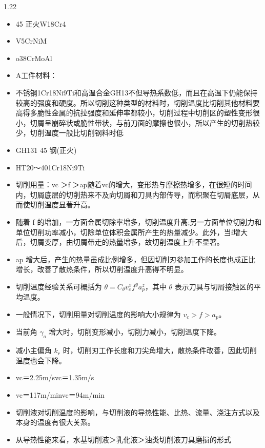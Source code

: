 \documentclass[12pt,a4paper]{article}
\begin{document}
\begin{spacing}{1.22}
\begin{itemize}[leftmargin=2.2em,label=--]
  \item 45 正火W18Cr4
  \item V5CrNiM
  \item o38CrMoAl
  \item A工件材料：
  \item 不锈钢1Cr18Ni9Ti和高温合金GH13不但导热系数低，而且在高温下仍能保持较高的强度和硬度。所以切削这种类型的材料时，切削温度比切削其他材料要高得多脆性金属的抗拉强度和延伸率都较小，切削过程中切削区的塑性变形很小，切屑呈崩碎状或脆性带状，与前刀面的摩擦也很小，所以产生的切削热较少，切削温度一般比切削钢料时低
  \item GH131 45 钢(正火)
  \item HT20～401Cr18Ni9Ti
  \item 切削用量：vc ＞f ＞ap随着vc的增大，变形热与摩擦热增多，在很短的时间内，切屑底层的切削热来不及向切屑和刀具内部传导，而积聚在切屑底层，从而使切削温度显著升高。
  \item 随着 f 的增加，一方面金属切除率增多，切削温度升高;另一方面单位切削力和单位切削功率减小，切除单位体积金属所产生的热量减少。此外，当f增大后，切屑变厚，由切屑带走的热量增多，故切削温度上升不显著。
  \item ap 增大后，产生的热量虽成比例增多，但因切削刃参加工作的长度也成正比增长，改善了散热条件，所以切削温度升高得不明显。
  \item 切削温度经验关系可概括为 $\theta=C_\theta v_c^x f^y a_p^z$，其中 $\theta$ 表示刀具与切屑接触区的平均温度。
  \item 一般情况下，切削用量对切削温度的影响大小规律为 $v_c > f > a_p$。
  \item 当前角 $\gamma_o$ 增大时，切削变形减小，切削力减小，切削温度下降。
  \item 减小主偏角 $k_r$ 时，切削刃工作长度和刀尖角增大，散热条件改善，因此切削温度也会下降。
  \item vc＝2.25m/svc＝1.35m/s
  \item vc＝117m/minvc＝94m/min
  \item 切削液对切削温度的影响，与切削液的导热性能、比热、流量、浇注方式以及本身的温度有很大关系。
  \item 从导热性能来看，水基切削液＞乳化液＞油类切削液刀具磨损的形式
\end{itemize}


\end{spacing}
\end{document}

